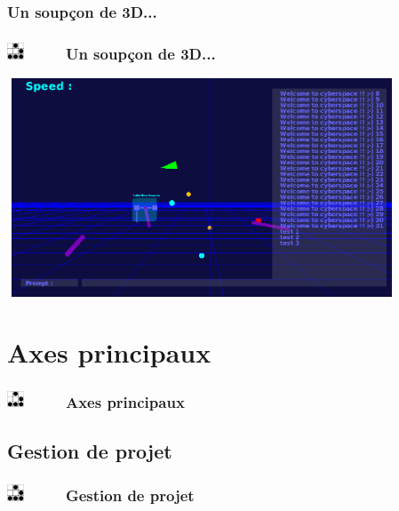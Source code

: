 \documentclass[slidetop,11pt]{beamer}
\def\sectionPartIIcTR{Un soup\c{c}on de 3D...}
\def\sectionPartI{Axes principaux}
\def\sectionPartIa{Gestion de projet}
\def\moreInFrameTitle{\includegraphics[height=0.5cm]{img/logo_glider.png}~~~~~}
\begin{document}
\subsubsection{\sectionPartIIcTR}
\begin{frame}
	\frametitle{\moreInFrameTitle \sectionPartIIcTR}
	\begin{center}
	\includegraphics[height=6.5cm,width=11.6cm]{img/persoCyberSpaceInterweb.png} 
	\end{center}
\end{frame}


\section{\sectionPartI}
\begin{frame}
	\frametitle{\moreInFrameTitle \sectionPartI}
	\tableofcontents[sections=2,subsectionstyle=shaded/shaded/shaded]
\end{frame} 

\subsection{\sectionPartIa}
\begin{frame}
	\frametitle{\moreInFrameTitle \sectionPartIa }
	\tableofcontents[sections=2,subsectionstyle=show/shaded/hide]
\end{frame} 
\end{document}
